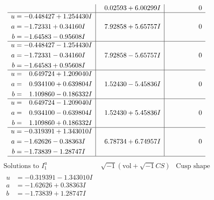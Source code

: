 \documentclass[1p]{elsarticle_modified}
\theoremstyle{definition}
\newcommand{\I}{\sqrt{-1}}
\begin{document}
$$\begin{array}{c|c|c}
 & \phantom{-}0.02593 + 6.00299 I & \phantom{-0.000000 } 0 \\ \hline\begin{aligned}
u &= -0.448427 + 1.254430 I \\
a &= -1.72331 + 0.34160 I \\
b &= -1.64583 - 0.95608 I\end{aligned}
 & \phantom{-}7.92858 + 5.65757 I & \phantom{-0.000000 } 0 \\ \hline\begin{aligned}
u &= -0.448427 - 1.254430 I \\
a &= -1.72331 - 0.34160 I \\
b &= -1.64583 + 0.95608 I\end{aligned}
 & \phantom{-}7.92858 - 5.65757 I & \phantom{-0.000000 } 0 \\ \hline\begin{aligned}
u &= \phantom{-}0.649724 + 1.209040 I \\
a &= \phantom{-}0.934100 + 0.639804 I \\
b &= \phantom{-}1.109860 - 0.186332 I\end{aligned}
 & \phantom{-}1.52430 - 5.45836 I & \phantom{-0.000000 } 0 \\ \hline\begin{aligned}
u &= \phantom{-}0.649724 - 1.209040 I \\
a &= \phantom{-}0.934100 - 0.639804 I \\
b &= \phantom{-}1.109860 + 0.186332 I\end{aligned}
 & \phantom{-}1.52430 + 5.45836 I & \phantom{-0.000000 } 0 \\ \hline\begin{aligned}
u &= -0.319391 + 1.343010 I \\
a &= -1.62626 - 0.38363 I \\
b &= -1.73839 - 1.28747 I\end{aligned}
 & \phantom{-}6.78734 + 6.74957 I & \phantom{-0.000000 } 0\\
 \hline 
 \end{array}$$\newpage$$\begin{array}{c|c|c}  
\text{Solutions to }I^u_{1}& \I (\text{vol} + \sqrt{-1}CS) & \text{Cusp shape}\\
 \hline 
\begin{aligned}
u &= -0.319391 - 1.343010 I \\
a &= -1.62626 + 0.38363 I \\
b &= -1.73839 + 1.28747 I\end{aligned}

\end{array}$$
\end{document}
